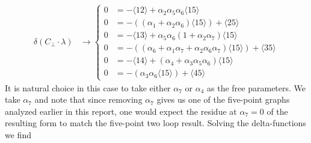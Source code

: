 \documentclass[letter,11pt]{article}
\begin{document}
\begin{equation}
	\begin{aligned}
		\delta(C_\perp\cdot \lambda)&\rightarrow\begin{cases}
	0&=-\langle 1 2 \rangle + \alpha_{2} \alpha_{5} \alpha_{6} \langle 1 5 \rangle
		\\
		0&=-((\alpha_{1} + \alpha_{2} \alpha_{6}) \langle 1 5 \rangle) + \langle 2 5 \rangle
		\\
		0&=-\langle 1 3 \rangle + \alpha_{5} \alpha_{6} (1 + \alpha_{2} \alpha_{7}) \langle 1 5 \rangle
		\\
		0&=-((\alpha_{6} + \alpha_{1} \alpha_{7} + \alpha_{2} \alpha_{6} \alpha_{7}) \langle 1 5 \rangle) + \langle 3 5 \rangle
		\\
		0&=-\langle 1 4 \rangle + (\alpha_{4} + \alpha_{3} \alpha_{5} \alpha_{6}) \langle 1 5 \rangle
		\\
		0&=-(\alpha_{3} \alpha_{6} \langle 1 5 \rangle) + \langle 4 5 \rangle
		\end{cases}
	\end{aligned}
\end{equation}
%
%
%
%
%
%
%
%
%
%
%
%
It is natural choice in this case to take either $\alpha_7$ or $\alpha_4$ as the free parameters. We take $\alpha_7$ and note that since removing $\alpha_7$ gives us one of the five-point graphs analyzed earlier in this report, one would expect the residue at $\alpha_7=0$ of the resulting form to match the five-point two loop result. Solving the delta-functions we find
\end{document}
